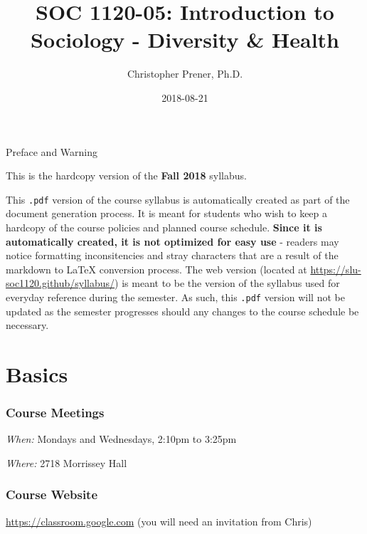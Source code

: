 \documentclass[]{book}
\title{SOC 1120-05: Introduction to Sociology - Diversity \& Health}
\author{Christopher Prener, Ph.D.}
\date{2018-08-21}
\theoremstyle{definition}
\theoremstyle{definition}
\theoremstyle{definition}
\theoremstyle{remark}
\begin{document}
\maketitle

\begin{center}
{\huge Preface and Warning} \\
\end{center}
\vspace{5mm}
This is the hardcopy version of the \textbf{Fall 2018} syllabus.
\vspace{5mm}
\par \noindent This \texttt{.pdf} version of the course syllabus is automatically created as part of the document generation process. It is meant for students who wish to keep a hardcopy of the course policies and planned course schedule. \textbf{Since it is automatically created, it is not optimized for easy use} - readers may notice formatting inconsitencies and stray characters that are a result of the markdown to \LaTeX{} conversion process. The web version (located at \href{https://slu-soc1120.github/syllabus/}{https://slu-soc1120.github/syllabus/}) is meant to be the version of the syllabus used for everyday reference during the semester. As such, this \texttt{.pdf} version will not be updated as the semester progresses should any changes to the course schedule be necessary.

\hypertarget{basics}{%
\chapter*{Basics}\label{basics}}

\hypertarget{course-meetings}{%
\subsection*{Course Meetings}\label{course-meetings}}

\emph{When:} Mondays and Wednesdays, 2:10pm to 3:25pm

\emph{Where:} 2718 Morrissey Hall

\hypertarget{course-website}{%
\subsection*{Course Website}\label{course-website}}

\url{https://classroom.google.com} (you will need an invitation from
Chris)
\end{document}
